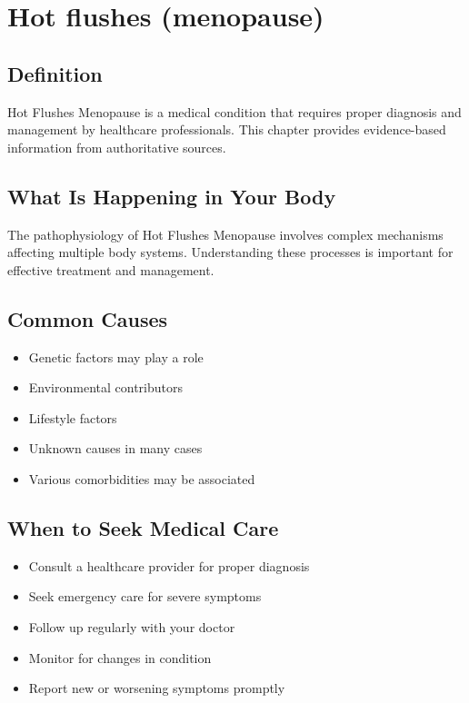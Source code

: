 
\chapter{Hot flushes (menopause)}

\section*{Definition}
Hot Flushes Menopause is a medical condition that requires proper diagnosis and management by healthcare professionals. This chapter provides evidence-based information from authoritative sources.

\section*{What Is Happening in Your Body}
The pathophysiology of Hot Flushes Menopause involves complex mechanisms affecting multiple body systems. Understanding these processes is important for effective treatment and management.

\section*{Common Causes}
\begin{itemize}
  \item Genetic factors may play a role
  \item Environmental contributors
  \item Lifestyle factors
  \item Unknown causes in many cases
  \item Various comorbidities may be associated
\end{itemize}

\section*{When to Seek Medical Care}
\begin{itemize}
  \item Consult a healthcare provider for proper diagnosis
  \item Seek emergency care for severe symptoms
  \item Follow up regularly with your doctor
  \item Monitor for changes in condition
  \item Report new or worsening symptoms promptly
\end{itemize}


